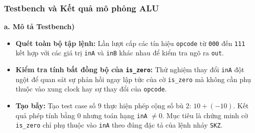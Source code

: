 \subsubsection{Testbench và Kết quả mô phỏng ALU}

\textbf{a. Mô tả Testbench)} \\
\begin{itemize}
    \item \textbf{Quét toàn bộ tập lệnh:} Lần lượt cấp các tín hiệu \texttt{opcode} từ \texttt{000} đến \texttt{111} kết hợp với các giá trị \texttt{inA} và \texttt{inB} khác nhau để kiểm tra ngõ ra \texttt{out}.
    \item \textbf{Kiểm tra tính bất đồng bộ của \texttt{is\_zero}:} Thử nghiệm thay đổi \texttt{inA} đột ngột để quan sát sự phản hồi ngay lập tức của cờ \texttt{is\_zero} mà không cần phụ thuộc vào xung clock hay sự thay đổi của \texttt{opcode}.
    \item \textbf{Tạo bẫy:} Tạo test case số 9 thực hiện phép cộng số bù 2: $10 + (-10)$. 
    Kết quả phép tính bằng 0 nhưng toán hạng \texttt{inA} $\neq 0$. 
    Mục tiêu là chứng minh cờ \texttt{is\_zero} chỉ phụ thuộc vào \texttt{inA} theo đúng đặc tả của lệnh nhảy \texttt{SKZ}.
\end{itemize}

